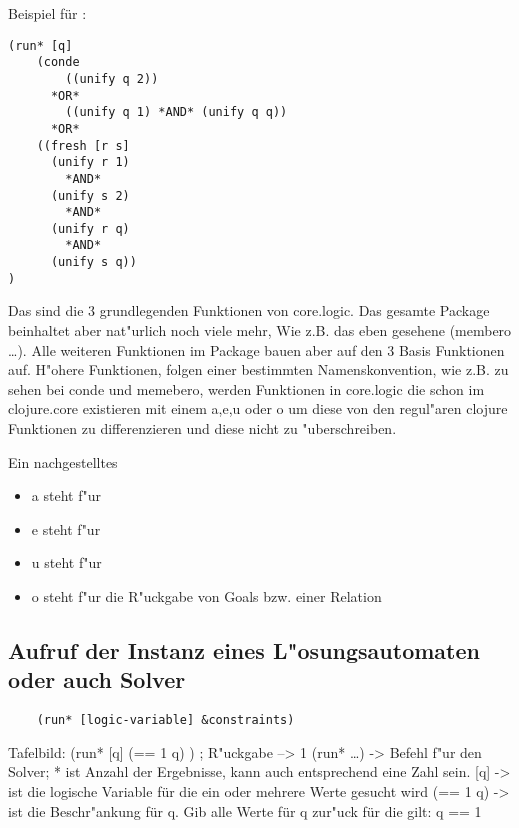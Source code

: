 Beispiel für :
\begin{lstlisting}
(run* [q]
    (conde
        ((unify q 2))
	  *OR*
        ((unify q 1) *AND* (unify q q))
	  *OR*
	((fresh [r s] 
	  (unify r 1)
	    *AND*
	  (unify s 2)
	    *AND*
	  (unify r q)
	    *AND*
	  (unify s q))
)
\end{lstlisting}

Das sind die 3 grundlegenden Funktionen von core.logic. Das gesamte Package beinhaltet aber nat"urlich noch viele mehr, Wie z.B. das eben gesehene (membero \dots{}). Alle weiteren Funktionen im Package bauen aber auf den 3 Basis Funktionen auf. H"ohere Funktionen, folgen einer bestimmten Namenskonvention, wie z.B. zu sehen bei conde und memebero, werden Funktionen in core.logic die schon im clojure.core existieren mit einem a,e,u oder o um diese von den regul"aren clojure Funktionen zu differenzieren und diese nicht zu "uberschreiben.

Ein nachgestelltes 
\begin{itemize}
  \item a steht f"ur 
  
  \item e steht f"ur 
  
  \item u steht f"ur 
  
  \item o steht f"ur die R"uckgabe von Goals bzw. einer Relation

\end{itemize}

\subsection{Aufruf der Instanz eines L"osungsautomaten oder auch Solver}

\begin{lstlisting}
    (run* [logic-variable] &constraints)
\end{lstlisting}


Tafelbild: (run* [q] (== 1 q) ) ; R"uckgabe --> 1
(run* \dots{}) -> Befehl f"ur den Solver; * ist Anzahl der Ergebnisse, kann auch entsprechend eine Zahl sein.
[q] -> ist die logische Variable für die ein oder mehrere Werte gesucht wird
(== 1 q) -> ist die Beschr"ankung für q.
\dq{}Gib alle Werte für q zur"uck für die gilt: q == 1\dq{}
